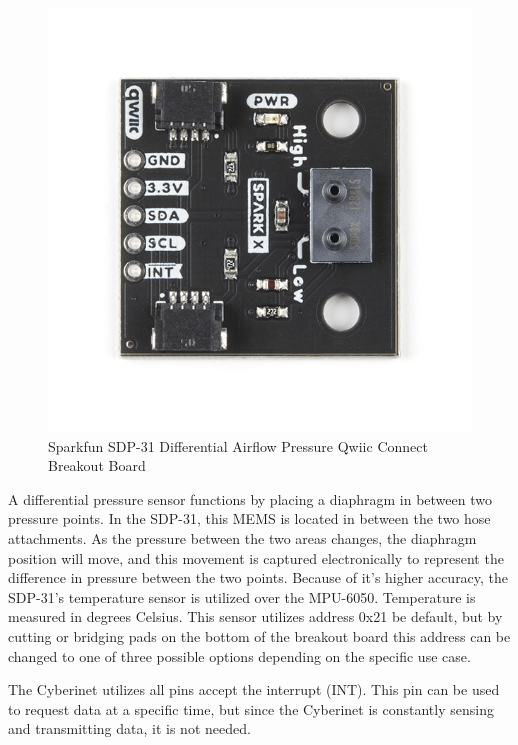 \begin{center}
    \begin{figure}
        \centering
        \includegraphics[scale=1.5, angle=90]{diagrams/oem/spd31.jpg}
        \caption{Sparkfun SDP-31 Differential Airflow Pressure Qwiic Connect Breakout Board} %
        \label{fig:sdp-31}
    \end{figure}
\end{center}

A differential pressure sensor functions by placing a diaphragm in between two pressure points. In the SDP-31, this MEMS is located in between the two hose attachments. As the pressure between the two areas changes, the diaphragm position will move, and this movement is captured electronically to represent the difference in pressure between the two points\cite{airflow}. Because of it’s higher accuracy, the SDP-31’s temperature sensor is utilized over the MPU-6050. Temperature is measured in degrees Celsius. This sensor utilizes address 0x21 be default, but by cutting or bridging pads on the bottom of the breakout board this address can be changed to one of three possible options depending on the specific use case.

The Cyberinet utilizes all pins accept the interrupt (INT). This pin can be used to request data at a specific time, but since the Cyberinet is constantly sensing and transmitting data, it is not needed.

